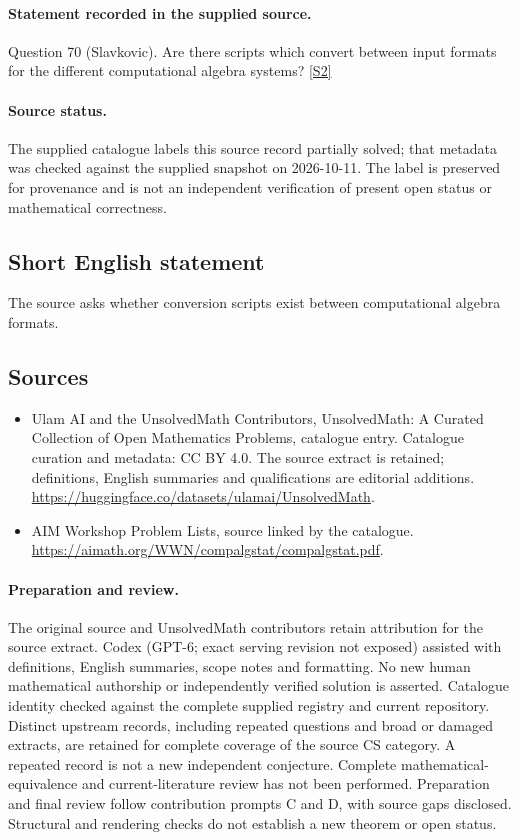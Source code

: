 \documentclass[11pt]{article}
\begin{document}
\paragraph{Statement recorded in the supplied source.}
Question 70 (Slavkovic). Are there scripts which convert between input formats for the different computational algebra systems? \href{https://aimath.org/WWN/compalgstat/compalgstat.pdf}{[S2]}
\paragraph{Source status.}
The supplied catalogue labels this source record partially solved; that metadata was checked against the supplied snapshot on 2026-10-11. The label is preserved for provenance and is not an independent verification of present open status or mathematical correctness.
\subsection{Short English statement}
The source asks whether conversion scripts exist between computational algebra formats.
\subsection{Sources}
\begin{itemize}
\item[S1] Ulam AI and the UnsolvedMath Contributors, UnsolvedMath: A Curated Collection of Open Mathematics Problems, catalogue entry. Catalogue curation and metadata: CC BY 4.0. The source extract is retained; definitions, English summaries and qualifications are editorial additions.
\url{https://huggingface.co/datasets/ulamai/UnsolvedMath}.
\item[S2] AIM Workshop Problem Lists, source linked by the catalogue.
\url{https://aimath.org/WWN/compalgstat/compalgstat.pdf}.
\end{itemize}
\paragraph{Preparation and review.}
The original source and UnsolvedMath contributors retain attribution for the source extract. Codex (GPT-6; exact serving revision not exposed) assisted with definitions, English summaries, scope notes and formatting. No new human mathematical authorship or independently verified solution is asserted. Catalogue identity checked against the complete supplied registry and current repository. Distinct upstream records, including repeated questions and broad or damaged extracts, are retained for complete coverage of the source CS category. A repeated record is not a new independent conjecture. Complete mathematical-equivalence and current-literature review has not been performed. Preparation and final review follow contribution prompts C and D, with source gaps disclosed. Structural and rendering checks do not establish a new theorem or open status.
\label{end:statement}
\end{document}
